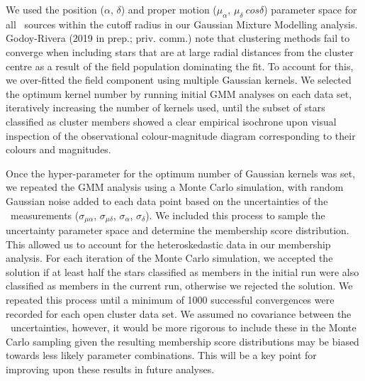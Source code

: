 
We used the position ($\alpha$, $\delta$) and proper motion ($\mu_{\alpha}$, $\mu_{\delta}~cos\delta$) parameter space for all \Gaia~sources within the cutoff radius in our Gaussian Mixture Modelling analysis. %
Godoy-Rivera (2019 in prep.; priv. comm.) note that clustering methods fail to converge when including stars that are at large radial distances from the cluster centre as a result of the field population dominating the fit. To account for this, we over-fitted the field component using multiple Gaussian kernels. We selected the optimum kernel number by running initial GMM analyses on each data set, iteratively increasing the number of kernels used, until the subset of stars classified as cluster members showed a clear empirical isochrone upon visual inspection of the observational colour-magnitude diagram corresponding to their colours and magnitudes. 

Once the hyper-parameter for the optimum number of Gaussian kernels was set, we repeated the GMM analysis using a Monte Carlo simulation, with random Gaussian noise added to each data point based on the uncertainties of the \Gaia~measurements ($\sigma_{\mu\alpha}$, $\sigma_{\mu\delta}$, $\sigma_{\alpha}$, $\sigma_{\delta}$). We included this process to sample the uncertainty parameter space and determine the membership score distribution. This allowed us to account for the heteroskedastic data in our membership analysis. For each iteration of the Monte Carlo simulation, we accepted the solution if at least half the stars classified as members in the initial run were also classified as members in the current run, otherwise we rejected the solution. We repeated this process until a minimum of 1000 successful convergences were recorded for each open cluster data set. We assumed no covariance between the \Gaia~uncertainties, however, it would be more rigorous to include these in the Monte Carlo sampling given the resulting membership score distributions may be biased towards less likely parameter combinations. This will be a key point for improving upon these results in future analyses.

